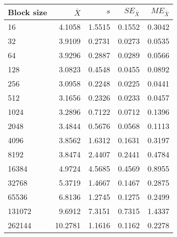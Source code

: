 \begin{tabular}{lrrrr}\toprule
{\small Block size} & $\bar{X}$ & $s$ & $SE_{\bar{X}}$ & $ME_{\bar{X}}$ \\\midrule
16 & 4.1058 & 1.5515 & 0.1552 & 0.3042\\
32 & 3.9109 & 0.2731 & 0.0273 & 0.0535\\
64 & 3.9296 & 0.2887 & 0.0289 & 0.0566\\
128 & 3.0823 & 0.4548 & 0.0455 & 0.0892\\
256 & 3.0958 & 0.2248 & 0.0225 & 0.0441\\
512 & 3.1656 & 0.2326 & 0.0233 & 0.0457\\
1024 & 3.2896 & 0.7122 & 0.0712 & 0.1396\\
2048 & 3.4844 & 0.5676 & 0.0568 & 0.1113\\
4096 & 3.8562 & 1.6312 & 0.1631 & 0.3197\\
8192 & 3.8474 & 2.4407 & 0.2441 & 0.4784\\
16384 & 4.9724 & 4.5685 & 0.4569 & 0.8955\\
32768 & 5.3719 & 1.4667 & 0.1467 & 0.2875\\
65536 & 6.8136 & 1.2745 & 0.1275 & 0.2499\\
131072 & 9.6912 & 7.3151 & 0.7315 & 1.4337\\
262144 & 10.2781 & 1.1616 & 0.1162 & 0.2278\\
\bottomrule
\end{tabular}

